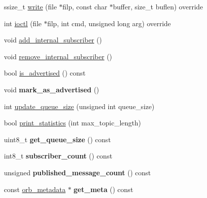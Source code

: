 \begin{DoxyCompactItemize}
\item 
ssize\+\_\+t \hyperlink{classuORB_1_1DeviceNode_ab58b8b4b6cac9fd8aa4d90a85e044c78}{write} (file $\ast$filp, const char $\ast$buffer, size\+\_\+t buflen) override
\item 
int \hyperlink{classuORB_1_1DeviceNode_acad1520dfb19e9449546dad7a4129c26}{ioctl} (file $\ast$filp, int cmd, unsigned long arg) override
\item 
void \hyperlink{classuORB_1_1DeviceNode_abb03278ff4ddd2a50e0f2996e856f2cc}{add\+\_\+internal\+\_\+subscriber} ()
\item 
void \hyperlink{classuORB_1_1DeviceNode_ab4d0aa7c41ff0a8b2bf7b88fdc03d13d}{remove\+\_\+internal\+\_\+subscriber} ()
\item 
bool \hyperlink{classuORB_1_1DeviceNode_a16d1880bc99853428a8d8a240f24857b}{is\+\_\+advertised} () const
\item 
\mbox{\label{classuORB_1_1DeviceNode_a5d9144fd43c624636a633d9dc288061a}} 
void {\bfseries mark\+\_\+as\+\_\+advertised} ()
\item 
int \hyperlink{classuORB_1_1DeviceNode_aa4a59b86caeebbdf513dd60fcee1f5ba}{update\+\_\+queue\+\_\+size} (unsigned int queue\+\_\+size)
\item 
bool \hyperlink{classuORB_1_1DeviceNode_ad37197e0ca241eff70bd5aeeb4a811a2}{print\+\_\+statistics} (int max\+\_\+topic\+\_\+length)
\item 
\mbox{\label{classuORB_1_1DeviceNode_a7877236ac1912c32c2ab6ae06899392d}} 
uint8\+\_\+t {\bfseries get\+\_\+queue\+\_\+size} () const
\item 
\mbox{\label{classuORB_1_1DeviceNode_abccd5704db90417288e15fcfec5de633}} 
int8\+\_\+t {\bfseries subscriber\+\_\+count} () const
\item 
\mbox{\label{classuORB_1_1DeviceNode_a45adbc432af16d0f7dd5b8e0b4c0cc8b}} 
unsigned {\bfseries published\+\_\+message\+\_\+count} () const
\item 
\mbox{\label{classuORB_1_1DeviceNode_a8de74e0e15d84cc83fb916c33fd87fba}} 
const \hyperlink{structorb__metadata}{orb\+\_\+metadata} $\ast$ {\bfseries get\+\_\+meta} () const
\item 
\mbox{\label{classuORB_1_1DeviceNode_aa27dc606dff52f3c76fea72acb45230a}} 

\end{DoxyCompactItemize}
